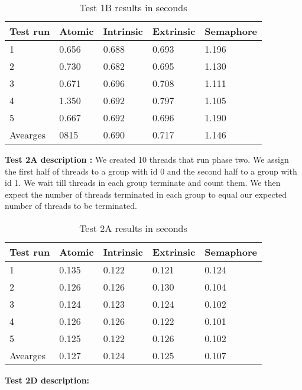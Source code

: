 \documentclass[11pt]{article}
\begin{document}
\begin{table}[H]
\centering
\caption{Test 1B results in seconds}
\label{tab:my-table}
\begin{tabular}{|l|l|l|l|l|}
\hline
Test run & Atomic & Intrinsic & Extrinsic & Semaphore \\ \hline
1        & 0.656  & 0.688     & 0.693     & 1.196     \\ \hline
2        & 0.730  & 0.682     & 0.695     & 1.130     \\ \hline
3        & 0.671  & 0.696     & 0.708     & 1.111     \\ \hline
4        & 1.350  & 0.692     & 0.797     & 1.105     \\ \hline
5        & 0.667  & 0.692     & 0.696     & 1.190     \\ \hline
Avearges & 0815   & 0.690     & 0.717     & 1.146     \\ \hline
\end{tabular}
\end{table}

\textbf{Test 2A description :} We created 10 threads that run phase two. We assign the first half of threads to a group with id 0 and the second half to a group with id 1. We wait till threads in each group terminate and count them. We then expect the number of threads terminated in each group to equal our expected number of threads to be terminated. \\


\begin{table}[H]
\centering
\caption{Test 2A results in seconds}
\label{tab:my-table}
\begin{tabular}{|l|l|l|l|l|}
\hline
Test run & Atomic & Intrinsic & Extrinsic & Semaphore \\ \hline
1        & 0.135  & 0.122     & 0.121     & 0.124     \\ \hline
2        & 0.126  & 0.126     & 0.130     & 0.104     \\ \hline
3        & 0.124  & 0.123     & 0.124     & 0.102     \\ \hline
4        & 0.126  & 0.126     & 0.122     & 0.101     \\ \hline
5        & 0.125  & 0.122     & 0.126     & 0.102     \\ \hline
Avearges & 0.127  & 0.124     & 0.125     & 0.107     \\ \hline
\end{tabular}
\end{table}

\textbf{Test 2D description:}
\\ \\ 
\end{document}
